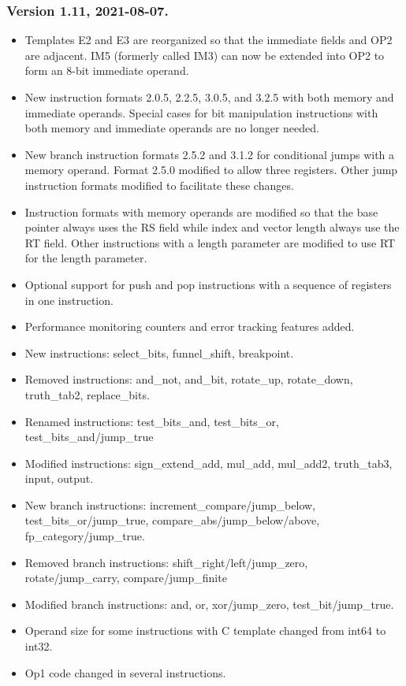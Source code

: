 \documentclass[forwardcom.tex]{subfiles}
\begin{document}
\subsubsection{Version 1.11, 2021-08-07.}
\begin{itemize}
\item Templates E2 and E3 are reorganized so that the immediate fields and OP2 are adjacent. IM5 (formerly called IM3) can now be extended into OP2 to form an 8-bit immediate operand.
\item New instruction formats 2.0.5, 2.2.5, 3.0.5, and 3.2.5 with both memory and immediate operands. Special cases for bit manipulation instructions with both memory and immediate operands are no longer needed.
\item New branch instruction formats 2.5.2 and 3.1.2 for conditional jumps with a memory operand. Format 2.5.0 modified to allow three registers. Other jump instruction formats modified to facilitate these changes.
\item Instruction formats with memory operands are modified so that the base pointer always uses the RS field while index and vector length always use the RT field. Other instructions with a length parameter are modified to use RT for the length parameter.
\item Optional support for push and pop instructions with a sequence of registers in one instruction.
\item Performance monitoring counters and error tracking features added.
\item New instructions: select\_bits, funnel\_shift, breakpoint.
\item Removed instructions: and\_not, and\_bit, rotate\_up, rotate\_down, truth\_tab2, replace\_bits.
\item Renamed instructions: test\_bits\_and, test\_bits\_or, test\_bits\_and/jump\_true
\item Modified instructions: sign\_extend\_add, mul\_add, mul\_add2, truth\_tab3, input, output.
\item New branch instructions: increment\_compare/jump\_below, test\_bits\_or/jump\_true,  
compare\_abs/jump\_below/above, fp\_category/jump\_true.
\item Removed branch instructions: shift\_right/left/jump\_zero, 
rotate/jump\_carry, compare/jump\_finite
\item Modified branch instructions: and, or, xor/jump\_zero, test\_bit/jump\_true.
\item Operand size for some instructions with C template changed from int64 to int32.
\item Op1 code changed in several instructions.
\end{itemize}
\end{document}
